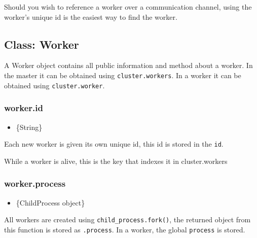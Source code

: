 Should you wish to reference a worker over a communication channel,
using the worker's unique id is the easiest way to find the worker.

\begin{Shaded}
\begin{Highlighting}[]
\NormalTok{(}\NormalTok{, }
   \NormalTok{[id];}
\NormalTok{\});}
\end{Highlighting}
\end{Shaded}

\subsection{Class: Worker}\label{class-worker}

A Worker object contains all public information and method about a
worker. In the master it can be obtained using \texttt{cluster.workers}.
In a worker it can be obtained using \texttt{cluster.worker}.

\subsubsection{worker.id}\label{worker.id}

\begin{itemize}
\itemsep1pt\parskip0pt
\item
  \{String\}
\end{itemize}

Each new worker is given its own unique id, this id is stored in the
\texttt{id}.

While a worker is alive, this is the key that indexes it in
cluster.workers

\subsubsection{worker.process}\label{worker.process}

\begin{itemize}
\itemsep1pt\parskip0pt
\item
  \{ChildProcess object\}
\end{itemize}

All workers are created using \texttt{child\_process.fork()}, the
returned object from this function is stored as \texttt{.process}. In a
worker, the global \texttt{process} is stored.

